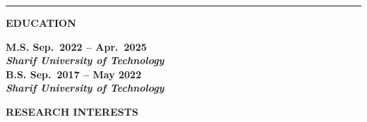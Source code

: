 \documentclass[12pt]{article}
\begin{document}

	\noindent\rule[0.5ex]{\linewidth}{.5pt}

\begin{center} %
	{\noindent \bfseries EDUCATION}
\end{center} %

 \vspace{-4pt} %

\noindent
 \bf{M.S.}
  \hfill Sep.\ 2022 -- Apr.\ 2025 \\
\noindent \textit{Sharif University of Technology} \\

\noindent
 \bf{B.S.}
 \hfill Sep.\ 2017 -- May 2022 \\
\noindent \textit{Sharif University of Technology} \\







\vspace{-8pt}
\begin{center}
	{\noindent \bfseries RESEARCH INTERESTS}
\end{center}
\end{document}
